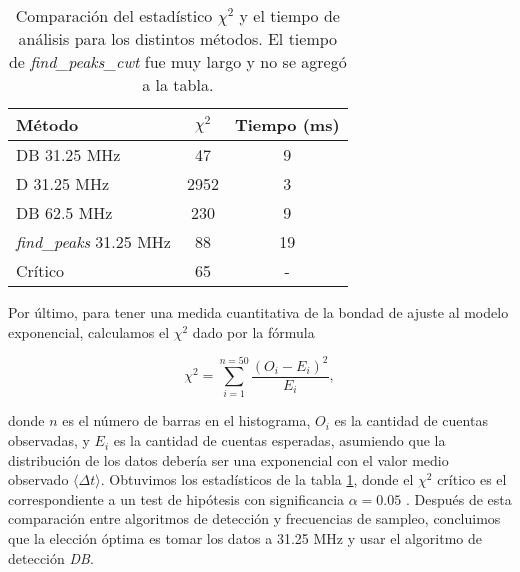 \begin{table}[t]
\centering
\begin{tabular}{|l|c|c|}
    \hline
    \textbf{Método} & \boldmath$\chi^2$ & \textbf{Tiempo (ms)} \\
    \hline
    DB 31.25 MHz & 47 & 9\\
    D 31.25 MHz & 2952 & 3\\
    DB 62.5 MHz & 230 & 9 \\
    \textit{find\_peaks} 31.25 MHz & 88 & 19 \\
    Crítico & 65 & - \\
    \hline
\end{tabular}
\caption{Comparación del estadístico $\chi^2$ y el tiempo de análisis para los distintos métodos. El tiempo de \textit{find\_peaks\_cwt} fue muy largo y no se agregó a la tabla.}
\label{tab:chisq}
\end{table}

Por último, para tener una medida cuantitativa de la bondad de ajuste al modelo exponencial, calculamos el $\chi^2$ dado por la fórmula 

\begin{equation}
    \chi^2  = \sum_{i=1}^{n=50} \frac{(O_i - E_i)^2}{E_i},
\end{equation}

\noindent donde $n$ es el número de barras en el histograma, $O_i$ es la cantidad de cuentas observadas, y $E_i$ es la cantidad de cuentas esperadas, asumiendo que la distribución de los datos debería ser una exponencial con el valor medio observado $\langle \Delta t \rangle$.
Obtuvimos los estadísticos de la tabla \ref{tab:chisq}, donde el $\chi^2$ crítico es el correspondiente a un test de hipótesis con significancia $\alpha = 0.05$ \cite{frodesen_probability_1979}.
Después de esta comparación entre algoritmos de detección y frecuencias de sampleo, concluimos que la elección óptima es tomar los datos a 31.25 MHz y usar el algoritmo de detección \textit{DB}.


